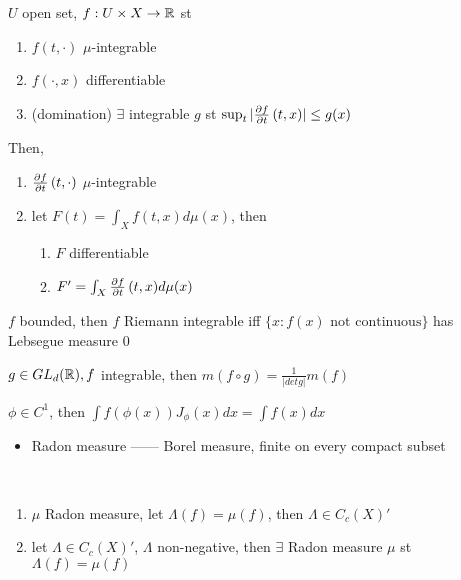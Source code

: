\begin{cor}
    $U$ open set, $f: U \times X \rightarrow \mathbb{R}$ st
    \begin{enumerate}
        \item $f(t, \cdot)$ $\mu$-integrable
        \item $f(\cdot, x)$ differentiable
        \item (domination) $\exists$ integrable $g$ st $\sup_{t} |\pdv{f}{t}\,(t, x)| \leq g(x)$
    \end{enumerate}
    Then,
    \begin{enumerate}
        \item $\pdv{f}{t}\,(t, \cdot)$ $\mu$-integrable
        \item let $F(t) = \int_X f(t, x) d\mu(x)$, then
        \begin{enumerate}
            \item $F$ differentiable
            \item $F' = \int_X \pdv{f}{t}\,(t, x)d\mu(x)$
        \end{enumerate}
    \end{enumerate}
\end{cor}

\begin{fact}
    $f$ bounded, then $f$ Riemann integrable iff $\{x : f(x) \text{ not continuous}\}$ has Lebsegue measure 0
\end{fact}

\begin{fact}
    $g \in GL_d(\mathbb{R}), f$ integrable, then $m(f \circ g) = \frac{1}{|det g|}m(f)$
\end{fact}

\begin{fact}
    $\phi \in C^1$, then $\int f(\phi(x))J_\phi(x)dx = \int f(x)dx$
\end{fact}

\begin{itemize}
    \item Radon measure ------ Borel measure, finite on every compact subset
\end{itemize}

\begin{fact}
    \,
    \begin{enumerate}
        \item $\mu$ Radon measure, let $\Lambda(f) = \mu(f)$, then $\Lambda \in C_c(X)'$
        \item let $\Lambda \in C_c(X)'$, $\Lambda$ non-negative, then $\exists$ Radon measure $\mu$ st $\Lambda(f) = \mu(f)$
    \end{enumerate}
\end{fact}